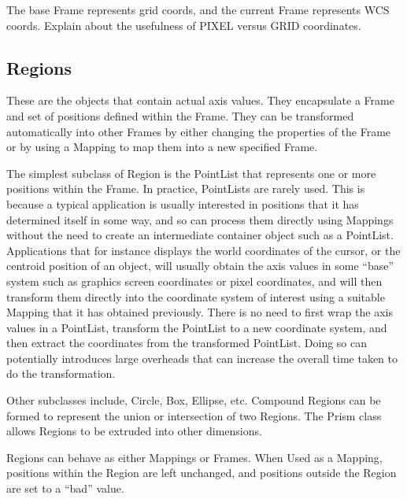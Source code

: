 \documentclass[final,authoryear,5p,times,twocolumn]{elsarticle}
\begin{document}
The base Frame represents grid coords, and the current Frame
represents WCS coords.  Explain about the usefulness of PIXEL versus
GRID coordinates.

\subsection{Regions}

These are the objects that contain actual axis values. They
encapsulate a Frame and set of positions defined within the
Frame. They can be transformed automatically into other Frames by
either changing the properties of the Frame or by using a Mapping to
map them into a new specified Frame.

The simplest subclass of Region is the PointList that represents one
or more positions within the Frame.  In practice, PointLists are
rarely used. This is because a typical application is usually
interested in positions that it has determined itself in some way, and
so can process them directly using Mappings without the need to create
an intermediate container object such as a PointList. Applications
that for instance displays the world coordinates of the cursor, or the
centroid position of an object, will usually obtain the axis values in
some ``base'' system such as graphics screen coordinates or pixel
coordinates, and will then transform them directly into the coordinate
system of interest using a suitable Mapping that it has obtained
previously. There is no need to first wrap the axis values in a
PointList, transform the PointList to a new coordinate system, and
then extract the coordinates from the transformed PointList. Doing so
can potentially introduces large overheads that can increase the
overall time taken to do the transformation.

Other subclasses include, Circle, Box, Ellipse, etc. Compound Regions
can be formed to represent the union or intersection of two
Regions. The Prism class allows Regions to be extruded into other
dimensions.

Regions can behave as either Mappings or Frames. When Used as a
Mapping, positions within the Region are left unchanged, and positions
outside the Region are set to a ``bad'' value.
\end{document}
